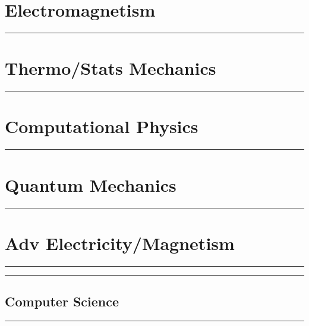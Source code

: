 \documentclass[10pt,titlepage]{asmath}
\newcommand{\hdiv}[3]{
  \vspace{#1}%
  \noindent\rule{\textwidth}{#2}%
  \vspace{#3}%
}
\theoremstyle{definition}
\begin{document}
\newpage
\part{Electromagnetism}
\label{prt:electromagnetism}
\hdiv{10pt}{2pt}{10pt}
\begin{multicols}{2}
  
\end{multicols}

\newpage
\part{Thermo/Stats Mechanics}
\label{prt:thermo_stats_mechanics}
\hdiv{10pt}{2pt}{10pt}
\begin{multicols}{2}
  
\end{multicols}

\newpage
\part{Computational Physics}
\label{prt:computational_physics}
\hdiv{10pt}{2pt}{10pt}
\begin{multicols}{2}
  
\end{multicols}

\newpage
\part{Quantum Mechanics}
\label{prt:quantum_mechanics}
\hdiv{10pt}{2pt}{10pt}
\begin{multicols}{2}
  
\end{multicols}

\newpage
\part{Adv Electricity/Magnetism}
\label{prt:adv_electricity_magnetism}
\hdiv{10pt}{2pt}{10pt}
\begin{multicols}{2}
  
\end{multicols}

\newpage
\vspace*{\fill}
\hdiv{10pt}{3pt}{15pt}
\chapter{Computer Science}%
\label{cha:computer_science}
\hdiv{15pt}{3pt}{10pt}
\vspace*{\fill}
\newpage
\end{document}
